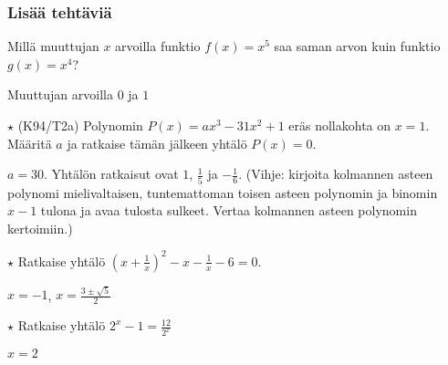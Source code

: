 \begin{tehtavasivu}
\subsubsection*{Lisää tehtäviä}

\begin{tehtava}
Millä muuttujan $x$ arvoilla funktio $f(x)=x^5$ saa saman arvon kuin funktio $g(x)=x^4$?
	\begin{vastaus}
Muuttujan arvoilla $0$ ja $1$
	\end{vastaus}
\end{tehtava}

\begin{tehtava}
$\star$ (K94/T2a) Polynomin $P(x)=ax^3-31x^2+1$ eräs nollakohta on $x=1$. Määritä $a$ ja ratkaise tämän jälkeen yhtälö $P(x)=0$.
\begin{vastaus}
      $a=30$. Yhtälön ratkaisut ovat $1$, $\frac{1}{5}$ ja $-\frac{1}{6}$. (Vihje: kirjoita kolmannen asteen polynomi mielivaltaisen, tuntemattoman toisen asteen polynomin ja binomin $x-1$ tulona ja avaa tulosta sulkeet. Vertaa kolmannen asteen polynomin kertoimiin.)
    \end{vastaus}
\end{tehtava}

\begin{tehtava}
	$ \star $ Ratkaise yhtälö $(x+\frac{1}{x})^2-x-\frac{1}{x}-6 = 0$.
	\begin{vastaus}
		$x = -1$, $x = \frac{3\pm \sqrt{5}}{2}$
	\end{vastaus}
\end{tehtava}

\begin{tehtava}
	$ \star $ Ratkaise yhtälö $2^x-1=\frac{12}{2^x}$
	\begin{vastaus}
	$x=2$
	\end{vastaus}
\end{tehtava}

\end{tehtavasivu}